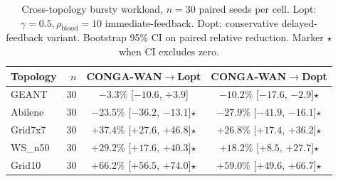 \begin{table}[t]
\centering
\small
\caption{Cross-topology bursty workload, $n=30$ paired seeds per cell. Lopt: $\gamma{=}0.5, \rho_{\mathrm{blood}}{=}10$ immediate-feedback. Dopt: conservative delayed-feedback variant. Bootstrap 95\% CI on paired relative reduction. Marker $\star$ when CI excludes zero.}
\label{tab:cross_topo_bursty}
\begin{tabular}{lrcc}
\toprule
Topology & $n$ & CONGA-WAN$\to$Lopt & CONGA-WAN$\to$Dopt \\
\midrule
GEANT & 30 & $-3.3\%$ [$-10.6$, $+3.9$] & $-10.2\%$ [$-17.6$, $-2.9$]$\star$ \\
Abilene & 30 & $-23.5\%$ [$-36.2$, $-13.1$]$\star$ & $-27.9\%$ [$-41.9$, $-16.1$]$\star$ \\
Grid7x7 & 30 & $+37.4\%$ [$+27.6$, $+46.8$]$\star$ & $+26.8\%$ [$+17.4$, $+36.2$]$\star$ \\
WS\_n50 & 30 & $+29.2\%$ [$+17.6$, $+40.3$]$\star$ & $+18.2\%$ [$+8.5$, $+27.7$]$\star$ \\
Grid10 & 30 & $+66.2\%$ [$+56.5$, $+74.0$]$\star$ & $+59.0\%$ [$+49.6$, $+66.7$]$\star$ \\
\bottomrule
\end{tabular}
\end{table}
